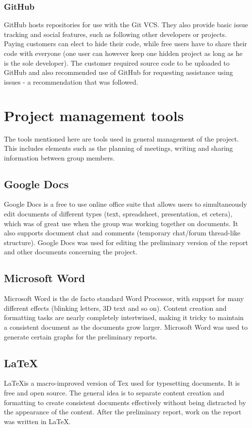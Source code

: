 \subsubsection{GitHub}
\label{GitHub}
GitHub hosts repositories for use with the Git VCS. They also provide basic issue tracking and social features, such as following other developers or projects. Paying customers can elect to hide their code, while free users have to share their code with everyone (one user can however keep one hidden project as long as he is the sole developer). The customer required source code to be uploaded to GitHub and also recommended use of GitHub for requesting assistance using issues - a recommendation that was followed.

\section{Project management tools}
The tools mentioned here are tools used in general management of the project. This includes elements such as the planning of meetings, writing and sharing information between group members.

\subsection{Google Docs}
Google Docs is a free to use online office suite that allows users to simultaneously edit documents of different types (text, spreadsheet, presentation, et cetera), which was of great use when the group was working together on documents. It also supports document chat and comments (temporary chat/forum thread-like structure). Google Docs was used for editing the preliminary version of the report and other documents concerning the project.

\subsection{Microsoft Word}
Microsoft Word is the de facto standard Word Processor, with support for many different effects (blinking letters, 3D text and so on). Content creation and formatting tasks are nearly completely intertwined, making it tricky to maintain a consistent document as the documents grow larger. Microsoft Word was used to generate certain graphs for the preliminary reports.

\subsection{\LaTeX}
\LaTeX is a macro-improved version of Tex used for typesetting documents. It is free and open source. The general idea is to separate content creation and formatting to create consistent documents effectively without being distracted by the appearance of the content. After the preliminary report, work on the report was written in \LaTeX.

